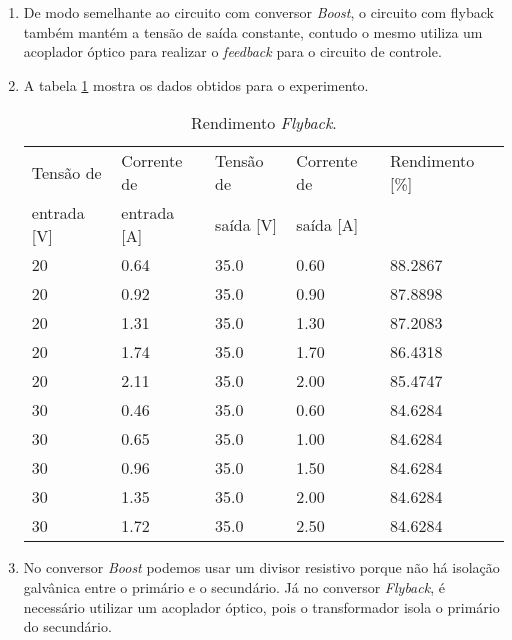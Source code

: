 \begin{enumerate}
    \item De modo semelhante ao circuito com conversor \textit{Boost}, o circuito com flyback também mantém a tensão de saída constante, contudo o mesmo utiliza um acoplador óptico para realizar o \textit{feedback} para o circuito de controle.
    
    \item A tabela \ref{tab:flyback2} mostra os dados obtidos para o experimento.
    
    \begin{small}
      \begin{table}[H]
        \begin{center}
          \caption{Rendimento \textit{Flyback}.}
          \begin{tabular}{l|l|l|l|l}
            \hline
            Tensão de   &  Corrente de 	& Tensão de & Corrente de	& Rendimento [\%]	\\
            entrada [V] &  entrada [A] 	& saída [V] & saída [A]  	& \\
            \hline
            20 		& 0.64			& 35.0		& 0.60			& 88.2867	\\
            \hline
            20		& 0.92			& 35.0		& 0.90			& 87.8898	\\
            \hline
            20		& 1.31			& 35.0		& 1.30			& 87.2083	\\
            \hline
            20		& 1.74			& 35.0		& 1.70			& 86.4318	\\
            \hline
            20		& 2.11			& 35.0		& 2.00			& 85.4747	\\
            \hline
            30		& 0.46			& 35.0		& 0.60			& 84.6284	\\
            \hline
            30		& 0.65			& 35.0		& 1.00			& 84.6284	\\
            \hline
            30		& 0.96			& 35.0		& 1.50			& 84.6284	\\
            \hline
            30		& 1.35			& 35.0		& 2.00			& 84.6284	\\
            \hline
            30		& 1.72			& 35.0		& 2.50			& 84.6284	\\
            \hline
          \end{tabular}
          \label{tab:flyback2}
        \end{center}
      \end{table}
    \end{small}
    
      \item No conversor \textit{Boost} podemos usar um divisor resistivo porque não há isolação galvânica entre o primário e o secundário. Já no conversor \textit{Flyback}, é necessário utilizar um acoplador óptico, pois o transformador isola o primário do secundário.
      

\end{enumerate}
